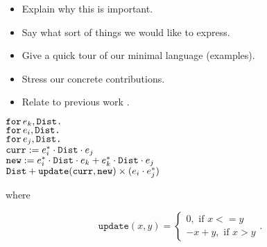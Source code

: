 %
%


\begin{itemize}
\item Explain why this is important.
\item Say what sort of things we would like to express.
\item Give a quick tour of our minimal language (examples).
\item Stress our concrete contributions.
\item Relate to previous work \cite{matlang,BrijderGBW19,Geerts19,HutchisonHS17}.
\end{itemize}


\noindent
$\texttt{for}\, e_k,\texttt{Dist} \texttt{.}\, $
\\
\hspace*{0.5cm} $\texttt{for}\, e_i,\texttt{Dist} \texttt{.}\, $
\\
\hspace*{1cm} $\texttt{for}\, e_j,\texttt{Dist} \texttt{.}\, $
\\
\hspace*{1.5cm} 
$\texttt{curr} := e_i^*\cdot \texttt{Dist} \cdot e_j$\\
\hspace*{1.5cm} 
$\texttt{new} := e_i^*\cdot \texttt{Dist} \cdot e_k + e_k^*\cdot \texttt{Dist}\cdot e_j$\\
\hspace*{1.5cm}
$\texttt{Dist} + \texttt{update}(\texttt{curr},\texttt{new})\times (e_i\cdot e_j^*)$

where

\[
  			\texttt{update}(x,y)=\begin{cases}
               0, \text{ if } x<=y \\
               -x + y, \text{ if } x > y
            \end{cases}.
		\]
